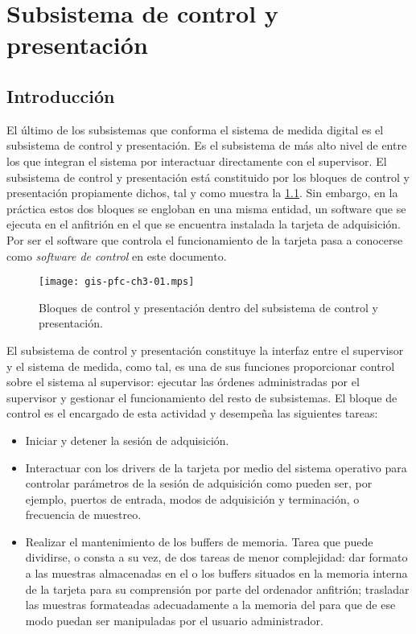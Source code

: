 \chapter{Subsistema de control y presentación}\label{chap:control}

\section{Introducción}

El último de los subsistemas que conforma el sistema de medida digital es
el subsistema de control y presentación. Es el subsistema de más alto nivel
de entre los que integran el sistema por interactuar directamente con el
supervisor. El subsistema de control y presentación está constituido por
los bloques de control y presentación propiamente dichos, tal y como
muestra la \cref{fig:subconpre}. Sin embargo, en la práctica estos dos
bloques se engloban en una misma entidad, un software que se ejecuta en el
\pc{} anfitrión en el que se encuentra instalada la tarjeta de adquisición.
Por ser el software que controla el funcionamiento de la tarjeta
\kpci{} pasa a conocerse como \emph{software de control} en este documento.

\begin{figure}
	\begin{center}
		\texttt{[image: gis-pfc-ch3-01.mps]}
	\end{center}
	\caption[Subsistema de control y presentación] {Bloques de control
	y presentación dentro del subsistema de control y presentación.}
	\label{fig:subconpre}
\end{figure}

El subsistema de control y presentación constituye la interfaz entre el
supervisor y el sistema de medida, como tal, es una de sus funciones
proporcionar control sobre el sistema al supervisor: ejecutar las órdenes
administradas por el supervisor y gestionar el funcionamiento del resto de
subsistemas. El bloque de control es el encargado de esta actividad y
desempeña las siguientes tareas:

\begin{itemize}
	\item Iniciar y detener la sesión de adquisición.
	\item Interactuar con los drivers de la tarjeta por medio del
		sistema operativo para controlar parámetros de la sesión de
		adquisición como pueden ser, por ejemplo, puertos de
		entrada, modos de adquisición y terminación, o frecuencia
		de muestreo.
	\item Realizar el mantenimiento de los buffers de memoria. Tarea
		que puede dividirse, o consta a su vez, de dos tareas de
		menor complejidad: dar formato a las muestras almacenadas
		en el o los buffers situados en la memoria interna de la
		tarjeta para su comprensión por parte del ordenador
		anfitrión; trasladar las muestras formateadas adecuadamente
		a la memoria del \pc{} para que de ese modo puedan ser
		manipuladas por el usuario administrador.
\end{itemize}

